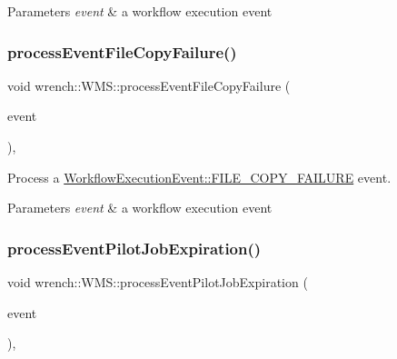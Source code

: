 \begin{DoxyParams}{Parameters}
{\em event} & a workflow execution event \\
\hline
\end{DoxyParams}
\mbox{\label{classwrench_1_1_w_m_s_a7aaff45943d82ae56e3d02626cdad6ef}} 
\subsubsection{\texorpdfstring{process\+Event\+File\+Copy\+Failure()}{processEventFileCopyFailure()}}
{\footnotesize\ttfamily void wrench\+::\+W\+M\+S\+::process\+Event\+File\+Copy\+Failure (\begin{DoxyParamCaption}\item[{std\+::unique\+\_\+ptr$<$ \hyperlink{classwrench_1_1_file_copy_failed_event}{File\+Copy\+Failed\+Event} $>$}]{event }\end{DoxyParamCaption})\hspace{0.3cm}{\ttfamily [protected]}, {\ttfamily [virtual]}}



Process a \hyperlink{classwrench_1_1_workflow_execution_event_a5611165191fbc4d121d1b141c748a448a07ede2c05015972efd6121b496739576}{Workflow\+Execution\+Event\+::\+F\+I\+L\+E\+\_\+\+C\+O\+P\+Y\+\_\+\+F\+A\+I\+L\+U\+RE} event. 


\begin{DoxyParams}{Parameters}
{\em event} & a workflow execution event \\
\hline
\end{DoxyParams}
\mbox{\label{classwrench_1_1_w_m_s_ab3b8812e525c47ed3942b8d51b9b31fd}} 
\subsubsection{\texorpdfstring{process\+Event\+Pilot\+Job\+Expiration()}{processEventPilotJobExpiration()}}
{\footnotesize\ttfamily void wrench\+::\+W\+M\+S\+::process\+Event\+Pilot\+Job\+Expiration (\begin{DoxyParamCaption}\item[{std\+::unique\+\_\+ptr$<$ \hyperlink{classwrench_1_1_pilot_job_expired_event}{Pilot\+Job\+Expired\+Event} $>$}]{event }\end{DoxyParamCaption})\hspace{0.3cm}{\ttfamily [protected]}, {\ttfamily [virtual]}}



